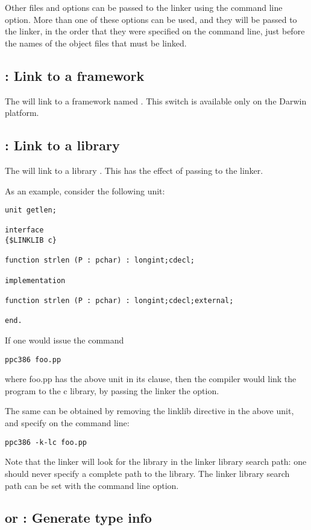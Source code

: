 Other files and options can be passed to the linker using the 
command line option. More than one of these options can be used, and
they will be passed to the linker, in the order that they were specified on
the command line, just before the names of the object files that must be
linked.

\subsection{ : Link to a framework}
The  will link to a framework named
. This switch is available only on the Darwin platform.

\subsection{ : Link to a library}
\label{se:linklib}

The  will link to a library .
This has the effect of passing  to the linker.

As an example, consider the following unit:
\begin{verbatim}
unit getlen;

interface
{$LINKLIB c}

function strlen (P : pchar) : longint;cdecl;

implementation

function strlen (P : pchar) : longint;cdecl;external;

end.
\end{verbatim}
If one would issue the command
\begin{verbatim}
ppc386 foo.pp
\end{verbatim}
where foo.pp has the above unit in its  clause,
then the compiler would link the program to the c library, by passing the
linker the  option.

The same can be obtained by removing the linklib directive in the
above unit, and specify  on the command line:
\begin{verbatim}
ppc386 -k-lc foo.pp
\end{verbatim}
Note that the linker will look for the library in the linker library search path:
one should never specify a complete path to the library.
The linker library search path can be set with the  command line option.

\subsection{ or  : Generate type info}

